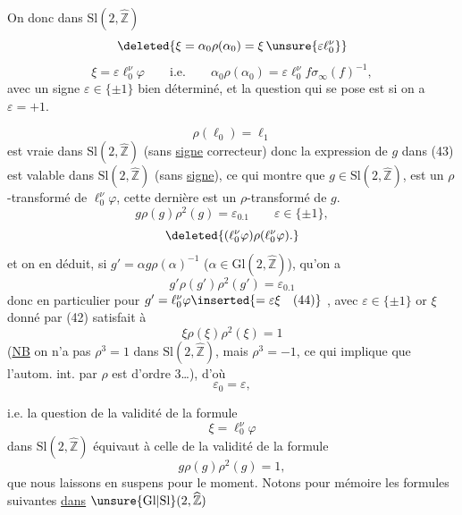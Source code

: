 On  donc dans $\mathrm{Sl}(2,\widehat{\mathbb Z})$
\[
 \deleted{\xi=\alpha_0\rho(\alpha_0)=\xi\,\unsure{\varepsilon\ell_0^\nu}}
\]
\[
 \xi=\varepsilon\ell_0^\nu\varphi
 \qquad\text{i.e.}\qquad
 \alpha_0\rho(\alpha_0)=\varepsilon\ell_0^\nu f\sigma_\infty(f)^{-1},
 \tag{44}
\]
avec un signe $\varepsilon\in\{\pm1\}$ bien déterminé, et la question qui se pose est si on a  $\varepsilon=+1$.

\[
 \rho(\ell_0)=\ell_1
\]
est vraie dans $\mathrm{Sl}(2,\widehat{\mathbb Z})$ (sans \uline{signe} correcteur) donc la  expression de $g$ dans (43) est valable dans $\mathrm{Sl}(2,\widehat{\mathbb Z})$ (sans \uline{signe}), ce qui montre que $g\in\mathrm{Sl}(2,\widehat{\mathbb Z})$,  est un $\rho$-transformé de $\ell_0^\nu\varphi$,  cette dernière est un $\rho$-transformé de $g$.
\[
 g\rho(g)\rho^2(g)=\varepsilon_0.1
 \qquad\varepsilon\in\{\pm1\},
\]
\[
 \deleted{(\ell_0^\nu\varphi)\rho(\ell_0^\nu\varphi).}
\]
et  on en déduit, si $g'=\alpha g\rho(\alpha)^{-1}$
\deleted{\unsure{$\rho^2\in$}} ($\alpha\in\mathrm{Gl}(2,\widehat{\mathbb Z})$), qu'on a
\[
 g'\rho(g')\rho^2(g')=\varepsilon_0.1
\]
donc en particulier pour $g'=\ell_0^\nu\varphi\inserted{=\varepsilon\xi\quad\text{(44)}}$ , avec $\varepsilon\in\{\pm1\}$  or $\xi$ donné par (42) satisfait à
\[
 \xi\rho(\xi)\rho^2(\xi)=1
\]
(\uline{NB} on n'a pas $\rho^3=1$ dans $\mathrm{Sl}(2,\widehat{\mathbb Z})$, mais $\rho^3=-1$, ce qui implique que l'autom. int.   par $\rho$ est d'ordre 3\ldots), d'où
\[
 \varepsilon_0=\varepsilon,
\]


i.e. la question de la validité de la formule
\[
 \xi=\ell_0^\nu\varphi
\]
dans $\mathrm{Sl}(2,\widehat{\mathbb Z})$ équivaut à celle de la validité de la formule
\[
 g\rho(g)\rho^2(g)=1,
\]
que nous laissons en suspens pour le moment. Notons pour mémoire les formules suivantes \uline{dans} \uline{$\unsure{\mathrm{Gl}|\mathrm{Sl}}(2,\widehat{\mathbb Z})$}

